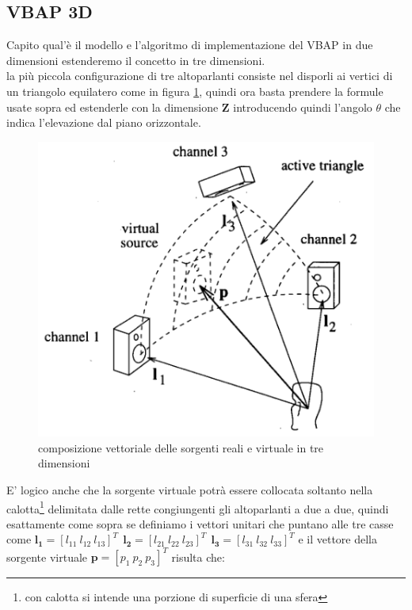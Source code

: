 \documentclass[12pt,a4paper]{report}
\begin{document}
\subsection{VBAP 3D}

Capito qual'è il modello e l'algoritmo di implementazione del VBAP in due dimensioni estenderemo il concetto in tre dimensioni.\\

la più piccola configurazione di tre altoparlanti consiste nel disporli ai vertici di un triangolo equilatero come in figura \ref{fig:triangolo}, quindi ora basta prendere la formule usate sopra ed estenderle con la dimensione $\boldsymbol{Z}$ introducendo quindi l'angolo $\theta$ che indica l'elevazione dal piano orizzontale.

\begin{figure}[htbp]
	\centering
	\includegraphics[scale=0.40]{figures/matrix3d.png}
	\caption {composizione vettoriale delle sorgenti reali e virtuale in tre dimensioni} 
	\label{fig:triangolo}
	\end{figure}

E' logico anche che la sorgente virtuale potrà essere collocata soltanto nella calotta\footnote{con calotta si intende una porzione di superficie di una sfera} delimitata dalle rette congiungenti gli altoparlanti a due a due,	 quindi esattamente come sopra se definiamo i vettori unitari che puntano alle tre casse come $ \boldsymbol{l_{1}}= {\left[ l_{11} \ l_{12} \ l_{13} \right]}^T \ \ \boldsymbol{l_{2}}= {\left[ l_{21} \ l_{22} \ l_{23} \right]}^T \ \ \boldsymbol{l_{3}}= {\left[ l_{31} \ l_{32} \ l_{33} \right]}^T$ e il vettore della sorgente virtuale $\boldsymbol{p}= {\left[ p_{1} \ p_{2} \ p_{3} \right]}^T$ risulta che:
\end{document}
